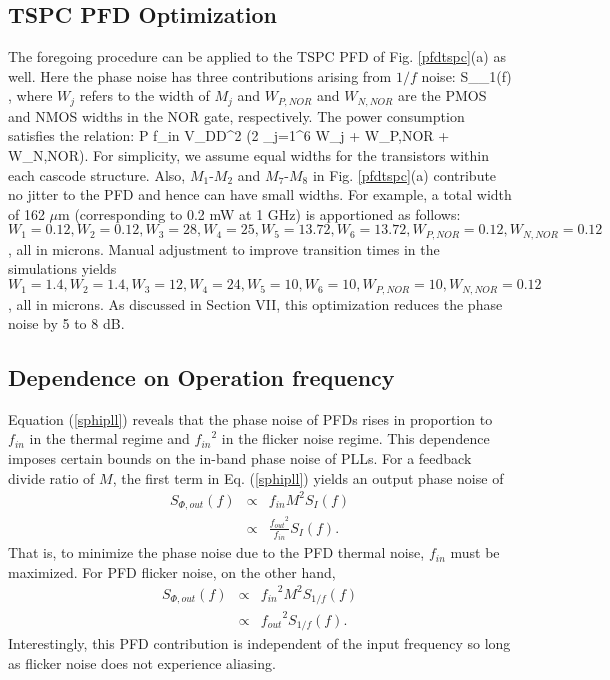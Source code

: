 \subsection{TSPC PFD Optimization}
The foregoing procedure can be applied to the TSPC PFD of Fig. \ref{pfdtspc}(a) as well. Here the phase noise has three contributions arising from
$1/f$ noise:
\beq
S_{\Phi _1}(f) \propto {},
\label{sphit1}
\eeq
where $W_j$ refers to the width of $M_j$ and $W_{P,NOR}$ and $W_{N,NOR}$ are the PMOS and NMOS widths in the NOR gate, respectively. The
power consumption satisfies the relation:
\beq
P \propto f_{in} {V_{DD}}^2 (2 \sum_{j=1}^{6} W_j + W_{P,NOR}  + W_{N,NOR}).
\label{powert}
\eeq
For simplicity, we assume equal widths for the transistors within each cascode structure. Also, $M_1$-$M_2$ and $M_7$-$M_8$ in Fig.
\ref{pfdtspc}(a) contribute no
jitter to the PFD and hence can have small widths. For example, a total width of 162 $\mu$m {(corresponding to
0.2 mW at 1 GHz)} is apportioned as follows:
$W_1 = 0.12, W_2 = 0.12, W_3 = 28,
 W_4 = 25, W_5 = 13.72, W_6 = 13.72, 
 W_{P,NOR} = 0.12, W_{N,NOR} = 0.12$,
all in microns. Manual adjustment to improve transition times in the simulations yields
$W_1 = 1.4, W_2 = 1.4, W_3 = 12, 
 W_4 = 24, W_5 = 10, W_6 = 10,
 W_{P,NOR} = 10, W_{N,NOR} = 0.12$, all in microns. As discussed in Section VII, this optimization reduces the phase noise by 5 to 8 dB.

\subsection{Dependence on Operation frequency}
Equation (\ref{sphipll}) reveals that the phase noise of PFDs rises in proportion to $f_{in}$ in the thermal regime and
${f_{in}}^2$ in the flicker noise regime. This dependence imposes certain bounds on the in-band phase noise of PLLs. For a feedback divide
ratio of $M$, the first term in Eq. (\ref{sphipll}) yields an output phase noise of
\begin{eqnarray}
S_{\Phi, out}(f) &\propto& f_{in} M^2 S_{I}(f) \nonumber \\ &\propto& \frac{{f_{out}}^2} {f_{in}} S_{I}(f).
\label{sphiwfreq}
\end{eqnarray}
That is, to minimize the phase noise due to the PFD thermal noise, $f_{in}$ must be maximized. For PFD flicker noise, on the other hand, 
\begin{eqnarray}
S_{\Phi, out}(f) &\propto& {f_{in}}^2 M^2 S_{1/f}(f) \nonumber \\ &\propto& {{f_{out}}^2} S_{1/f}(f).
\label{sphiffreq}
\end{eqnarray}
Interestingly, this PFD contribution is independent of the input frequency so long as flicker noise does not experience aliasing.





